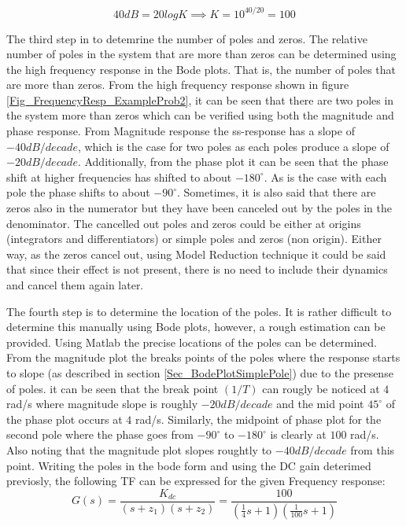 $$	40 dB = 20 log K \implies K = 10^{40/20}=100	$$

The third step in to detemrine the number of poles and zeros. The relative number of poles in the system that are more than zeros can be determined using the high frequency response in the Bode plots. That is, the number of poles that are more than zeros. From the high frequency response shown in figure \ref{Fig_FrequencyResp_ExampleProb2}, it can be seen that there are two poles in the system more than zeros which can be verified using both the magnitude and phase response. From Magnitude response the ss-response has a slope of $- 40 dB/decade$, which is the case for two poles as each poles produce a slope of $-20 dB /decade$. Additionally, from the phase plot it can be seen that the phase shift at higher frequencies has shifted to about $-180^{\circ}$. As is the case with each pole the phase shifts to about $-90^{\circ}$. Sometimes, it is also said that there are zeros also in the numerator but they have been canceled out by the poles in the denominator. The cancelled out poles and zeros could be either at origins (integrators and differentiators) or simple poles and zeros (non origin). Either way, as the zeros cancel out, using Model Reduction technique it could be said that since their effect is not present, there is no need to include their dynamics and cancel them again later.

The fourth step is to determine the location of the poles. It is rather difficult to determine this manually using Bode plots, however, a rough estimation can be provided. Using Matlab the precise locations of the poles can be determined. From the magnitude plot the breaks points of the poles where the response starts to slope (as described in section \ref{Sec_BodePlotSimplePole}) due to the presense of poles. it can be seen that the break point $(1/T)$ can rougly be noticed at $4$ rad/s where magnitude slope is roughly $-20 dB /decade$ and the mid point $45^{\circ}$ of the phase plot occurs at $4$ rad/s. Similarly, the midpoint of phase plot for the second pole where the phase goes from $-90^{\circ}$ to $-180^{\circ}$ is clearly at $100$ rad/s. Also noting that the magnitude plot slopes roughtly to $-40 dB/decade$ from this point. Writing the poles in the bode form and using the DC gain deterimed previosly, the following TF can be expressed for the given Frequency response:
\begin{equation}
	G(s) = \frac{K_{dc}}{(s + z_1)(s + z_2)} = \frac{100}{(\frac{1}{4}s + 1)(\frac{1}{100}s +1)}
\end{equation}

